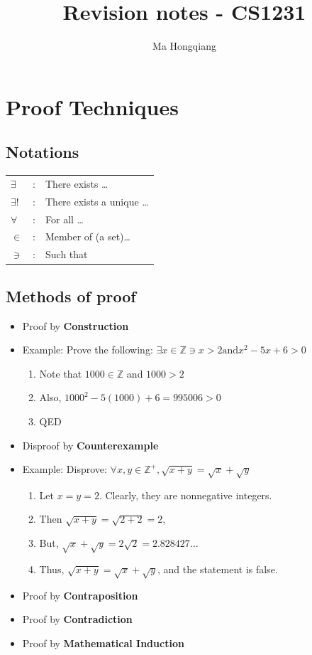 \documentclass[12pt]{article}
\begin{document}
\title{Revision notes - CS1231}
\author{Ma Hongqiang}
\maketitle
\vspace{-5em}
\tableofcontents
\clearpage
\section{Proof Techniques}
\subsection{Notations}
\begin{table}[h]
\centering
\begin{tabular}{lcl}
$\exists$&:&There exists \ldots\\
$\exists !$&:& There exists a unique \ldots\\
$\forall$&:& For all \ldots\\
$\in$&:& Member of (a set)\ldots\\
$\ni$&:& Such that\\
\end{tabular}
\end{table}
\subsection{Methods of proof}
\begin{itemize}
\item Proof by \textbf{Construction}
\item[] Example: Prove the following: $\exists x\in \mathbb{Z}\ni x>2 \text{and} x^2 -5x+6>0$
\begin{enumerate}
\item Note that $1000\in\mathbb{Z}$ and $1000>2$
\item Also, $1000^2 -5(1000)+6=995006>0$
\item[] QED
\end{enumerate}
\item Disproof by \textbf{Counterexample}
\item[] Example: Disprove: $\forall x,y\in\mathbb{Z}^+ ,\sqrt{x+y}=\sqrt{x}+\sqrt{y}$
\begin{enumerate}
\item Let $x=y=2$. Clearly, they are nonnegative integers.
\item Then $\sqrt{x+y}=\sqrt{2+2}=2$,
\item But, $\sqrt{x}+\sqrt{y}=2\sqrt{2}=2.828427\ldots$
\item Thus, $\sqrt{x+y}=\sqrt{x}+\sqrt{y}$, and the statement is false.
\end{enumerate}
\item Proof by \textbf{Contraposition}
\item Proof by \textbf{Contradiction}
\item Proof by \textbf{Mathematical Induction}
\end{itemize}
\clearpage
\end{document}
